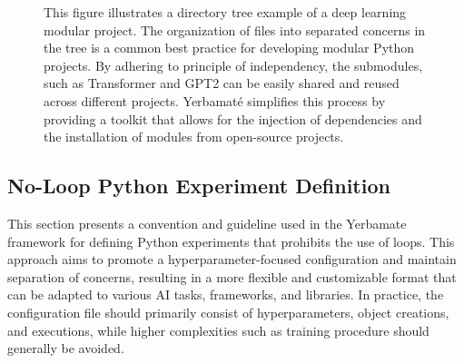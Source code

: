 


\begin{figure}
\centering
{}
\caption{
This figure illustrates a directory tree example of a deep learning modular project. The organization of files into separated concerns in the tree is a common best practice for developing modular Python projects. By adhering to principle of independency, the submodules, such as Transformer and GPT2 can be easily shared and reused across different projects. Yerbamaté simplifies this process by providing a toolkit that allows for the injection of dependencies and the installation of modules from open-source projects.
}
\end{figure}



\subsection{No-Loop Python Experiment Definition}

This section presents a convention and guideline used in the Yerbamate framework for defining Python experiments that prohibits the use of loops. This approach aims to promote a hyperparameter-focused configuration and maintain separation of concerns, resulting in a more flexible and customizable format that can be adapted to various AI tasks, frameworks, and libraries. In practice, the configuration file should primarily consist of hyperparameters, object creations, and executions, while higher complexities such as training procedure should generally be avoided.

